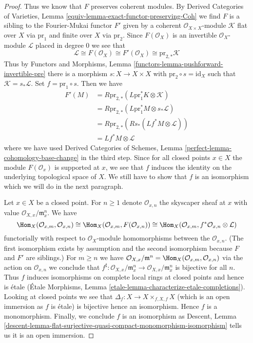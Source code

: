 \begin{proof}
\medskip\noindent
Thus we know that $F$ preserves coherent modules. By
Derived Categories of Varieties, Lemma
\ref{equiv-lemma-exact-functor-preserving-Coh}
we find $F$ is a sibling to the Fourier-Mukai functor $F'$ given by
a coherent $\mathcal{O}_{X \times X}$-module $\mathcal{K}$
flat over $X$ via $\text{pr}_1$ and finite over $X$ via $\text{pr}_2$.
Since $F(\mathcal{O}_X)$ is an invertible $\mathcal{O}_X$-module
$\mathcal{L}$ placed in degree $0$ we see that
$$
\mathcal{L} \cong F(\mathcal{O}_X) \cong F'(\mathcal{O}_X) \cong
\text{pr}_{2, *}\mathcal{K}
$$
Thus by
Functors and Morphisms, Lemma \ref{functors-lemma-pushforward-invertible-pre}
there
is a morphism $s : X \to X \times X$ with $\text{pr}_2 \circ s = \text{id}_X$
such that $\mathcal{K} = s_*\mathcal{L}$. Set $f = \text{pr}_1 \circ s$.
Then we have
\begin{align*}
F'(M)
& =
R\text{pr}_{2, *}(L\text{pr}_1^*K \otimes \mathcal{K}) \\
& =
R\text{pr}_{2, *}(L\text{pr}_1^*M \otimes s_*\mathcal{L}) \\
& =
R\text{pr}_{2, *}(Rs_*(Lf^*M \otimes \mathcal{L})) \\
& =
Lf^*M \otimes \mathcal{L}
\end{align*}
where we have used
Derived Categories of Schemes, Lemma \ref{perfect-lemma-cohomology-base-change}
in the third step.
Since for all closed points $x \in X$ the module $F(\mathcal{O}_x)$
is supported at $x$, we see that $f$ induces the identity on the
underlying topological space of $X$. We still have to show that
$f$ is an isomorphism which we will do in the next paragraph.

\medskip\noindent
Let $x \in X$ be a closed point.
For $n \geq 1$ denote $\mathcal{O}_{x, n}$ the skyscaper
sheaf at $x$ with value $\mathcal{O}_{X, x}/\mathfrak m_x^n$.
We have
$$
\Hom_X(\mathcal{O}_{x, m}, \mathcal{O}_{x, n}) \cong
\Hom_X(\mathcal{O}_{x, m}, F(\mathcal{O}_{x, n})) \cong
\Hom_X(\mathcal{O}_{x, m}, f^*\mathcal{O}_{x, n} \otimes \mathcal{L})
$$
functorially with respect to $\mathcal{O}_X$-module homomorphisms
between the $\mathcal{O}_{x, n}$. (The first isomorphism exists
by assumption and the second isomorphism because $F$ and $F'$ are siblings.)
For $m \geq n$ we have $\mathcal{O}_{X, x}/\mathfrak m^n =
\Hom_X(\mathcal{O}_{x, m}, \mathcal{O}_{x, n})$
via the action on $\mathcal{O}_{x, n}$
we conclude that $f^\sharp : \mathcal{O}_{X, x}/\mathfrak m_x^n \to
\mathcal{O}_{X, x}/\mathfrak m_x^n$ is bijective for all $n$.
Thus $f$ induces isomorphisms on complete local rings at closed
points and hence is \'etale
(\'Etale Morphisms, Lemma \ref{etale-lemma-characterize-etale-completions}).
Looking at closed points we see that
$\Delta_f : X \to X \times_{f, X, f} X$ (which is an open immersion
as $f$ is \'etale) is bijective hence an isomorphism.
Hence $f$ is a monomorphism. Finally, we conclude $f$ is an isomorphism
as Descent, Lemma
\ref{descent-lemma-flat-surjective-quasi-compact-monomorphism-isomorphism}
tells us it is an open immersion.
\end{proof}







